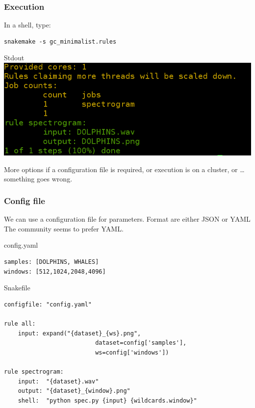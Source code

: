 \documentclass{beamer}
\begin{document}
\begin{frame}[fragile]
\frametitle{Execution}

      \begin{block}{In a shell, type:}
	  \begin{lstlisting}[basicstyle=\large]
	  snakemake -s gc_minimalist.rules 
	  \end{lstlisting}
      \end{block}
    \begin{block}{Stdout}
    \centering
    \includegraphics[scale=0.3]{images/screen1.png}
    \end{block}     
    
    
More options if a configuration file is required, or execution is on a cluster, 
or \dots something goes wrong.
\end{frame}


         
        

\begin{frame}[fragile]
    \frametitle{Config file}
     We can use a configuration file for parameters. Format are either JSON or YAML
    The community seems to prefer YAML.
    
    \begin{block}{config.yaml}
        \begin{lstlisting}
samples: [DOLPHINS, WHALES]
windows: [512,1024,2048,4096]
        \end{lstlisting}
    \end{block}
    \begin{block}{Snakefile}
    \begin{lstlisting}
configfile: "config.yaml"

rule all:
    input: expand("{dataset}_{ws}.png", 
                          dataset=config['samples'], 
                          ws=config['windows'])

rule spectrogram:
    input:  "{dataset}.wav"
    output: "{dataset}_{window}.png"    
    shell:  "python spec.py {input} {wildcards.window}"
    \end{lstlisting}
    \end{block}
\end{frame}
\end{document}
